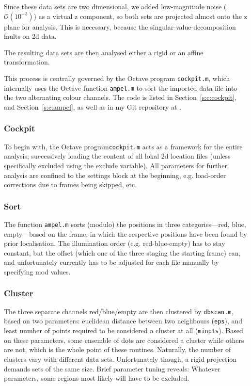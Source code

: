 \documentclass[11pt, a4paper, oneside, twocolumn]{report}
\renewcommand{\tt}{\texttt}
\begin{document}
Since these data sets are two dimensional, we added low-magnitude
noise ($\mathcal{O}(10^{-3})$) as a virtual z component, so both sets
are projected almost onto the z plane for analysis. This is necessary,
because the singular-value-decomposition faults on 2d data.

The resulting data sets are then analysed either a rigid or an affine
transformation.

This process is centrally governed by the Octave program
\tt{cockpit.m}, which internally uses the Octave function \tt{ampel.m}
to sort the imported data file into the two alternating colour
channels. The code is listed in Section~\ref{s:c:cockpit}, and
Section~\ref{s:c:ampel}, as well as in my Git repository at
\cite{sie21}.


\subsubsection{Cockpit}
  
To begin with, the Octave program\tt{cockpit.m} acts as a framework
for the entire analysis; successively loading the content of all lokal
2d location files (unless specifically excluded using the exclude
variable). All parameters for further analysis are confined to the
settings block at the beginning, e.g. load-order corrections due to
frames being skipped, etc.


\subsubsection{Sort}

The function \tt{ampel.m} sorts (modulo) the positions in three
categories---red, blue, empty---based on the frame, in which the
respective positions have been found by prior localisation. The
illumination order (e.g. red-blue-empty) has to stay constant, but the
offset (which one of the three staging the starting frame) can, and
unfortunately currently has to be adjusted for each file manually by
specifying mod values.


\subsubsection{Cluster}

The three separate channels red/blue/empty are then clustered by
\tt{dbscan.m}, based on two parameters: euclidean distance between two
neighbours (\tt{eps}), and least number of points required to be
considered a cluster at all (\tt{minpts}). Based on these parameters,
some ensemble of dots are considered a cluster while others are not,
which is the whole point of these routines. Naturally, the number of
clusters vary with different data sets. Unfortunately though, a rigid
projection demands sets of the same size. Brief parameter tuning
reveals: Whatever parameters, some regions most likely will have to be
excluded.
\end{document}
